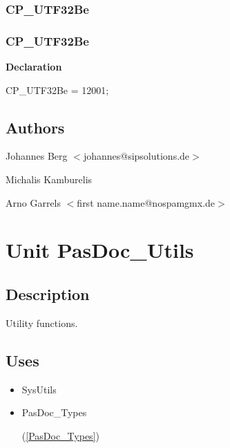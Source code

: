 \documentclass{report}
\newif\ifpdf
\begin{document}
\subsection*{\large{\textbf{CP{\_}UTF32Be}}\normalsize\hspace{1ex}\hrulefill}
\else
\subsection*{CP{\_}UTF32Be}
\fi
\label{PasDoc_Types-CP_UTF32Be}
\begin{list}{}{
\setlength{\itemindent}{0cm}
\setlength{\listparindent}{0cm}
\setlength{\leftmargin}{\evensidemargin}
\addtolength{\leftmargin}{\tmplength}
\settowidth{\labelsep}{X}
\addtolength{\leftmargin}{\labelsep}
\setlength{\labelwidth}{\tmplength}
}
\item[\textbf{Declaration}\hfill]
\ifpdf
\begin{flushleft}
\fi
\begin{ttfamily}
CP{\_}UTF32Be    = 12001;\end{ttfamily}

\ifpdf
\end{flushleft}
\fi

\end{list}
\section{Authors}
\par
Johannes Berg {$<$}johannes@sipsolutions.de{$>$}

\par
Michalis Kamburelis

\par
Arno Garrels {$<$}first name.name@nospamgmx.de{$>$}

\chapter{Unit PasDoc{\_}Utils}
\label{PasDoc_Utils}
\section{Description}
Utility functions.\hfill\vspace*{1ex}

   
\section{Uses}
\begin{itemize}
\item \begin{ttfamily}SysUtils\end{ttfamily}\item \begin{ttfamily}PasDoc{\_}Types\end{ttfamily}(\ref{PasDoc_Types})\end{itemize}
\end{document}
